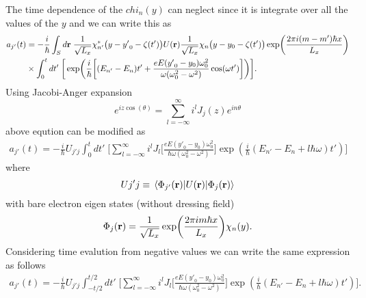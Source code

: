 The time dependence of the $chi_n(y)$ can neglect since it is integrate over all the values of the $y$ and we can write this as
\begin{equation} \label{2.16}
  \begin{aligned}
    a_{j'}(t) & =
   -\frac{i}{\hbar}
   \int_S d\vb{r} \;
   \frac{1}{\sqrt{L_x}} \chi_{n'}^*\big(y - {y'}_0 -\zeta(t')\big)
   U(\vb{r})
   \frac{1}{\sqrt{L_x}} \chi_{n}\big(y - y_0 -\zeta(t')\big)
   \exp(\frac{2\pi i(m-m') \hbar x}{L_x})
   \\ & \times
   \int_0^t dt' \;
   \bigg[
     \exp(
    \frac{i}{\hbar}\bigg[ (E_{n'} -E_{n}) t' +
   \frac{eE({y'}_0 - y_0)\omega_0^2}{\omega(\omega_0^2-\omega^2)}\cos(\omega t')
    \bigg])
    \bigg].
  \end{aligned}
\end{equation}
Using Jacobi-Anger expansion
\begin{equation} \label{2.17}
  e^{iz\cos(\theta)} = \sum_{l=-\infty}^{\infty} i^l J_j(z)e^{in\theta}
\end{equation}
above eqution can be modified as
\begin{equation} \label{2.18}
  \begin{aligned}
    a_{j'}(t)  =
   -\frac{i}{\hbar}
   U_{j'j}
   \int_0^t dt' \;
   \bigg[
   \sum_{l=-\infty}^{\infty} i^l J_l\bigg[\frac{eE({y'}_0 - y_0)\omega_0^2}{\hbar\omega(\omega_0^2-\omega^2)}\bigg]
     \exp(
    \frac{i}{\hbar} (E_{n'} -E_{n} + l\hbar\omega) t')
    \bigg]
  \end{aligned}
\end{equation}
where
\begin{equation} \label{2.19}
  U{j'j} \equiv \mel{\Phi_{j'}(\vb{r})}{U(\vb{r})}{\Phi_j(\vb{r})}
\end{equation}
with bare electron eigen states (without dressing field)
\begin{equation} \label{2.20}
  \Phi_{j}(\vb{r}) = \frac{1}{\sqrt{L_x}}\exp(\frac{2\pi im \hbar x}{L_x}) \chi_{n}(y).
\end{equation}
Considering time evalution from negative values we can write the same expression as follows
\begin{equation} \label{2.21}
  \begin{aligned}
    a_{j'}(t)  =
   -\frac{i}{\hbar}
   U_{j'j}
   \int_{-t/2}^{t/2} dt' \;
   \bigg[
   \sum_{l=-\infty}^{\infty} i^l J_l\bigg[\frac{eE({y'}_0 - y_0)\omega_0^2}{\hbar\omega(\omega_0^2-\omega^2)}\bigg]
     \exp(
    \frac{i}{\hbar} (E_{n'} -E_{n} + l\hbar\omega) t')
    \bigg].
  \end{aligned}
\end{equation}

